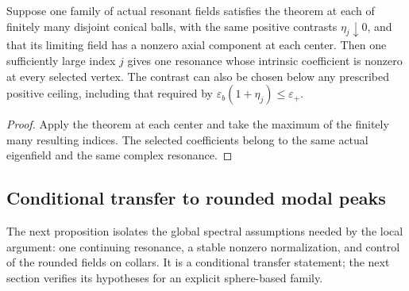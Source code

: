 \begin{corollary}
\label{hs:modal-all-coefficients}
Suppose one family of actual resonant fields satisfies the theorem
at each of finitely many disjoint conical balls, with the same
positive contrasts $\eta_j\downarrow0$, and that its limiting field
has a nonzero axial component at each center.  Then one sufficiently
large index $j$ gives one resonance whose intrinsic coefficient is
nonzero at every selected vertex.  The contrast can also be chosen
below any prescribed positive ceiling, including that required by
$\varepsilon_b(1+\eta_j)\leq\varepsilon_+$.
\end{corollary}

\begin{proof}
Apply the theorem at each center and take the maximum of the finitely
many resulting indices.  The selected coefficients belong to the
same actual eigenfield and the same complex resonance.
\end{proof}
\subsection{Conditional transfer to rounded modal peaks}

The next proposition isolates the global spectral assumptions needed by
the local argument: one continuing resonance, a stable nonzero normalization,
and control of the rounded fields on collars. It is a conditional transfer
statement; the next section verifies its hypotheses for an explicit
sphere-based family.

